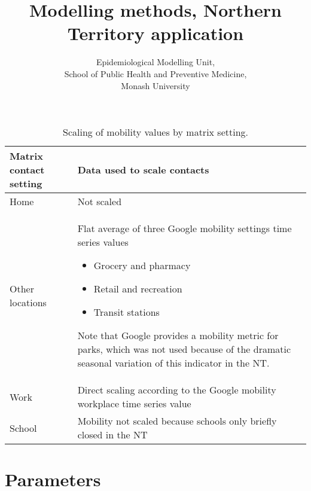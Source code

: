 \documentclass{article}
\author{
    Epidemiological Modelling Unit,
    \\ School of Public Health and Preventive Medicine,
    \\ Monash University
}
\title{Modelling methods, Northern Territory application}
\begin{document}
\maketitle
\tableofcontents
\newpage









\begin{table}[h]
    \begin{threeparttable}
    \begin{tabularx}{\textwidth}{| X | X |}
        \hline
        \textbf{Matrix contact setting} & \textbf{Data used to scale contacts} \\
        \hline
        Home & Not scaled \\
        \hline
        Other locations & 
        Flat average of three Google mobility settings time series values
        \begin{itemize}
            \item Grocery and pharmacy
            \item Retail and recreation
            \item Transit stations
        \end{itemize}
        Note that Google provides a mobility metric for parks, 
        which was not used because of the dramatic seasonal variation of this indicator
        in the NT.
        \\
        \hline
        Work & Direct scaling according to the Google mobility workplace time series value \\
        \hline
        School & Mobility not scaled because schools only briefly closed in the NT \\
        \hline
	\end{tabularx}
	\caption{Scaling of mobility values by matrix setting.}
	\label{tab:location_scaling}
    \end{threeparttable}
\end{table}


\section{Parameters}

\end{document}
